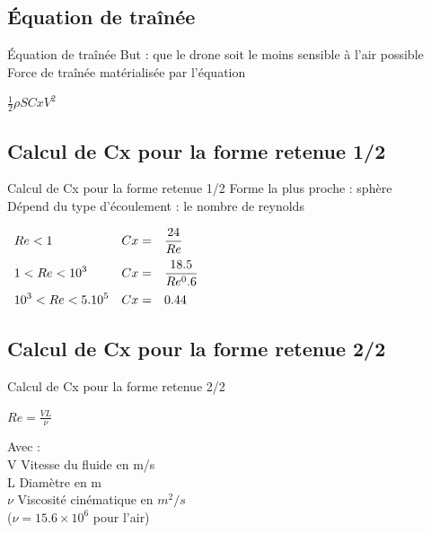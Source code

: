 \documentclass{beamer}
\begin{document}
\subsection{Équation de traînée}
\begin{frame}{Équation de traînée}
 But : que le drone soit le moins sensible à l'air possible \\
 Force de traînée matérialisée par l'équation \\
 \begin{center}
  $\displaystyle{\frac12 \rho S Cx V^2}$
 \end{center}
\end{frame}

\subsection{Calcul de Cx pour la forme retenue 1/2}
\begin{frame}{Calcul de Cx pour la forme retenue 1/2}
 Forme la plus proche : sphère \\
 Dépend du type d'écoulement : le nombre de reynolds \\
 \begin{center}
  $\begin{array}{>{\displaystyle}l>{\displaystyle}l>{\displaystyle}l}
   Re < 1 & Cx = & \frac{24}{Re} \medbreak \\
   1 < Re < 10^3 & Cx = & \frac{18.5}{Re^0.6} \medbreak \\
   10^3 < Re < 5.10^5 & Cx = & 0.44
  \end{array}$
 \end{center}
\end{frame}

\subsection{Calcul de Cx pour la forme retenue 2/2}
\begin{frame}{Calcul de Cx pour la forme retenue 2/2}
 \begin{center}
  $\displaystyle{Re = \frac{VL}{\nu}}$
 \end{center}
 Avec : \\
 V Vitesse du fluide en m/s \\
 L Diamètre en m \\
 $\nu$ Viscosité cinématique en $m^2/s$ \\
 ($\nu = 15.6 \times 10^6$ pour l'air)
\end{frame}
\end{document}
